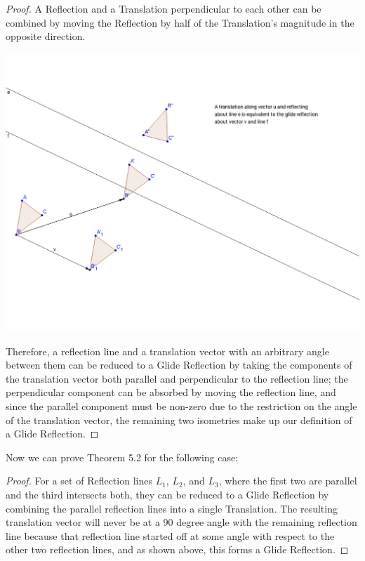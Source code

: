 \documentclass[11pt]{article}
\theoremstyle{definition}
\begin{document}
\begin{proof}
  A Reflection and a Translation perpendicular to each other can be combined by
  moving the Reflection by half of the Translation's magnitude in the opposite
  direction.



  \includegraphics[scale=.4]{glide}



  Therefore, a reflection line and a translation vector with an arbitrary angle
  between them can be reduced to a Glide Reflection by taking the components of
  the translation vector both parallel and perpendicular to the reflection
  line; the perpendicular component can be absorbed by moving the reflection
  line, and since the parallel component must be non-zero due to the
  restriction on the angle of the translation vector, the remaining two
  isometries make up our definition of a Glide Reflection.
\end{proof}

Now we can prove Theorem 5.2 for the following case:

\begin{proof}
  For a set of Reflection lines $L_{1}$, $L_{2}$, and $L_{3}$, where the first
  two are parallel and the third intersects both, they can be reduced to a
  Glide Reflection by combining the parallel reflection lines into a single
  Translation. The resulting translation vector will never be at a 90 degree
  angle with the remaining reflection line because that reflection line started
  off at some angle with respect to the other two reflection lines, and as
  shown above, this forms a Glide Reflection.
\end{proof}
\end{document}
